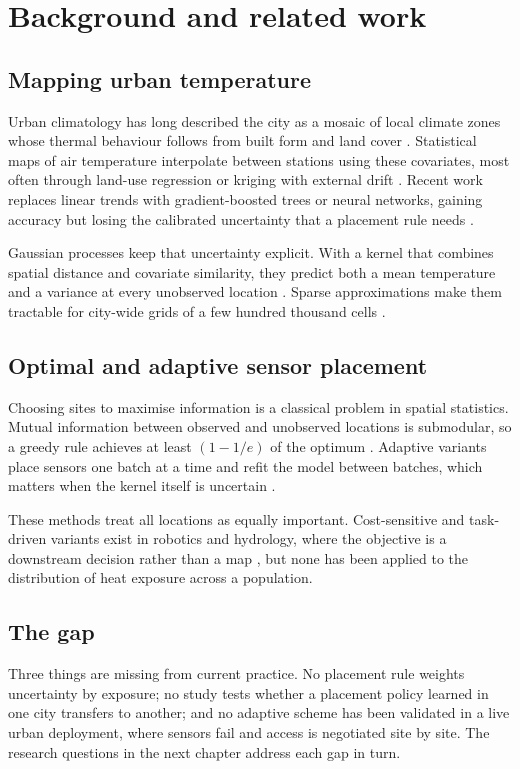 \chapter{Background and related work}\label{ch:background}

\section{Mapping urban temperature}

Urban climatology has long described the city as a mosaic of local
climate zones whose thermal behaviour follows from built form and land
cover \parencite{stewart2012local}. Statistical maps of air temperature
interpolate between stations using these covariates, most often through
land-use regression or kriging with external drift
\parencite{hjort2016spatial}. Recent work replaces linear trends with
gradient-boosted trees or neural networks, gaining accuracy but losing
the calibrated uncertainty that a placement rule needs
\parencite{venter2021hyperlocal}.

Gaussian processes keep that uncertainty explicit. With a kernel that
combines spatial distance and covariate similarity, they predict both a
mean temperature and a variance at every unobserved location
\parencite{rasmussen2006gaussian}. Sparse approximations make them
tractable for city-wide grids of a few hundred thousand cells
\parencite{hensman2013gaussian}.

\section{Optimal and adaptive sensor placement}

Choosing sites to maximise information is a classical problem in
spatial statistics. Mutual information between observed and unobserved
locations is submodular, so a greedy rule achieves at least
$(1-1/e)$ of the optimum \parencite{krause2008near}. Adaptive variants
place sensors one batch at a time and refit the model between batches,
which matters when the kernel itself is uncertain
\parencite{garnett2023bayesian}.

These methods treat all locations as equally important. Cost-sensitive
and task-driven variants exist in robotics and hydrology, where the
objective is a downstream decision rather than a map
\parencite{marchant2014bayesian}, but none has been applied to the
distribution of heat exposure across a population.

\section{The gap}

Three things are missing from current practice. No placement rule
weights uncertainty by exposure; no study tests whether a placement
policy learned in one city transfers to another; and no adaptive scheme
has been validated in a live urban deployment, where sensors fail and
access is negotiated site by site. The research questions in the next
chapter address each gap in turn.
